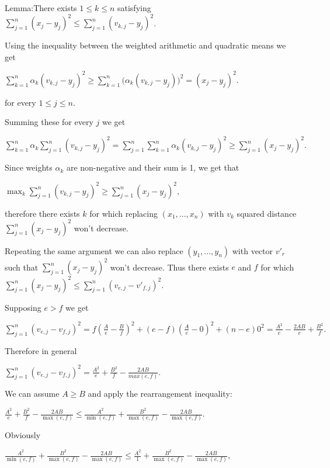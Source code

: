 \documentclass{article}
\begin{document}
Lemma:There exists \(\displaystyle 1\le k \le n\) satisfying \(\displaystyle \sum_{j=1}^n (x_j-y_j)^2\le \sum_{j=1}^n (v_{k,j}-y_j)^2\).

Using the inequality between the weighted arithmetic and quadratic means we get

\(\displaystyle \sum_{k=1}^n \alpha_k (v_{k,j}-y_j)^2\ge \sum_{k=1}^n \big(\alpha_k(v_{k,j}-y_j)\big)^2=(x_j-y_j)^2.\)

for every \(\displaystyle 1\le j \le n\).

Summing these for every \(\displaystyle j\) we get

\(\displaystyle \sum_{k=1}^n \alpha_k \sum_{j=1}^n (v_{k,j}-y_j)^2=\sum_{j=1}^{n} \sum_{k=1}^n \alpha_k (v_{k,j}-y_j)^2\ge \sum_{j=1}^{n} (x_j-y_j)^2.\)

Since weights \(\displaystyle \alpha_k\) are non-negative and their sum is 1, we get that

\(\displaystyle \max_{k} \sum_{j=1}^n (v_{k,j}-y_j)^2\ge \sum_{j=1}^{n} (x_j-y_j)^2,\)

therefore there exists \(\displaystyle k\) for which replacing \(\displaystyle (x_1,...,x_n)\) with \(\displaystyle v_k\) squared distance \(\displaystyle \sum_{j=1}^{n} (x_j-y_j)^2\) won't decrease.

Repeating the same argument we can also replace \(\displaystyle (y_1,...,y_n)\) with vector \(\displaystyle v'_r\) such that  \(\displaystyle \sum_{j=1}^{n} (x_j-y_j)^2\) won't decrease. Thus there exists \(\displaystyle e\) and \(\displaystyle f\) for which \(\displaystyle \sum_{j=1}^n (x_j-y_j)^2\le \sum_{j=1}^n (v_{e,j}-v'_{f,j})^2\).

Supposing \(\displaystyle e>f\) we get

\(\displaystyle \sum_{j=1}^n (v_{e,j}-v_{f,j})^2=f(\frac{A}{e}-\frac{B}{f})^2+(e-f)(\frac{A}{e}-0)^2+(n-e)0^2=\frac{A^2}{e}-\frac{2AB}{e}+\frac{B^2}{f}.\)

Therefore in general

\(\displaystyle \sum_{j=1}^n (v_{e,j}-v_{f,j})^2=\frac{A^2}{e}+\frac{B^2}{f}-\frac{2AB}{max(e,f)}.\)

We can assume \(\displaystyle A\ge B\) and apply the rearrangement inequality:

\(\displaystyle \frac{A^2}{e}+\frac{B^2}{f}-\frac{2AB}{\max(e,f)}\le \frac{A^2}{\min(e,f)}+\frac{B^2}{\max(e,f)}-\frac{2AB}{\max(e,f)}.\)

Obviously

\(\displaystyle \frac{A^2}{\min(e,f)}+\frac{B^2}{\max(e,f)}-\frac{2AB}{\max(e,f)}\le \frac{A^2}{1}+\frac{B^2}{\max(e,f)}-\frac{2AB}{\max(e,f)},\)
\end{document}

